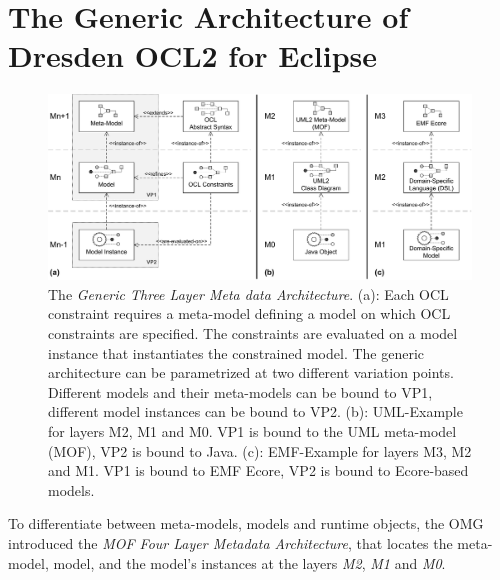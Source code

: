 \section{The Generic Architecture of Dresden OCL2 for Eclipse}

		\begin{figure}[tb]
			\centering
				\includegraphics[width=1.00\textwidth]{figures/genericlayers.pdf}
			\caption{The \textit{Generic Three Layer Meta data Architecture}. (a): Each OCL constraint 
			requires a meta-model defining a model on which OCL constraints are specified. The 
			constraints are evaluated on a model instance that instantiates the constrained model. 
			The generic architecture can be parametrized at two different variation points. Different
			models and their meta-models can be bound to VP1, different model instances can be bound
			to VP2.	(b): UML-Example for layers M2, M1 and M0. VP1 is bound to the UML meta-model (MOF), 
			VP2 is bound to Java. (c): EMF-Example for layers M3, M2 and M1. VP1 is bound to EMF Ecore,
			VP2 is bound to Ecore-based models.}
			\label{fig:genericlayers}
		\end{figure}

	To differentiate between meta-models, models and runtime objects, the OMG introduced 
	the \textit{MOF Four Layer Metadata Architecture}, that locates the meta-model, 
	model, and the model's instances at the layers \textit{M2}, \textit{M1} and \textit{M0}. 
	
